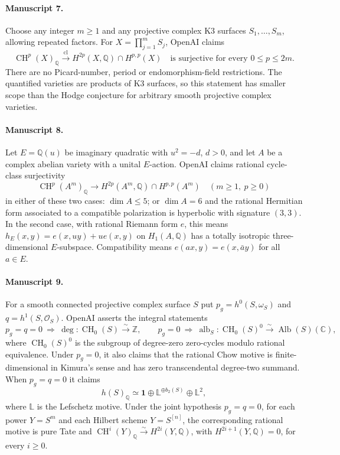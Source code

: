 \documentclass[11pt]{article}
\begin{document}
\paragraph{Manuscript 7.}
Choose any integer $m\ge1$ and any projective complex K3 surfaces $S_1,\ldots,S_m$, allowing repeated factors. For $X=\prod_{j=1}^m S_j$, OpenAI claims
\[
\operatorname{CH}^p(X)_{\mathbb Q}\xrightarrow{\operatorname{cl}}
H^{2p}(X,\mathbb Q)\cap H^{p,p}(X)
\quad\text{is surjective for every }0\le p\le2m.
\]
There are no Picard-number, period or endomorphism-field restrictions. The quantified varieties are products of K3 surfaces, so this statement has smaller scope than the Hodge conjecture for arbitrary smooth projective complex varieties.

\paragraph{Manuscript 8.}
Let $E=\mathbb Q(u)$ be imaginary quadratic with $u^2=-d$, $d>0$, and let $A$ be a complex abelian variety with a unital $E$-action. OpenAI claims rational cycle-class surjectivity
\[
\operatorname{CH}^p(A^m)_{\mathbb Q}\longrightarrow H^{2p}(A^m,\mathbb Q)\cap H^{p,p}(A^m)
\quad(m\ge1,\ p\ge0)
\]
in either of these two cases: $\dim A\le5$; or $\dim A=6$ and the rational Hermitian form associated to a compatible polarization is hyperbolic with signature $(3,3)$. In the second case, with rational Riemann form $e$, this means $h_E(x,y)=e(x,uy)+u e(x,y)$ on $H_1(A,\mathbb Q)$ has a totally isotropic three-dimensional $E$-subspace. Compatibility means $e(ax,y)=e(x,\bar a y)$ for all $a\in E$.

\paragraph{Manuscript 9.}
For a smooth connected projective complex surface $S$ put $p_g=h^0(S,\omega_S)$ and $q=h^1(S,\mathcal O_S)$. OpenAI asserts the integral statements
\[
p_g=q=0\ \Longrightarrow\ \deg:\operatorname{CH}_0(S)\xrightarrow{\sim}\mathbb Z,
\qquad
p_g=0\ \Longrightarrow\ \operatorname{alb}_S:\operatorname{CH}_0(S)^0\xrightarrow{\sim}\operatorname{Alb}(S)(\mathbb C),
\]
where $\operatorname{CH}_0(S)^0$ is the subgroup of degree-zero zero-cycles modulo rational equivalence. Under $p_g=0$, it also claims that the rational Chow motive is finite-dimensional in Kimura's sense and has zero transcendental degree-two summand. When $p_g=q=0$ it claims
\[
h(S)_{\mathbb Q}\simeq\mathbf1\oplus\mathbb L^{\oplus b_2(S)}\oplus\mathbb L^2,
\]
where $\mathbb L$ is the Lefschetz motive. Under the joint hypothesis $p_g=q=0$, for each power $Y=S^m$ and each Hilbert scheme $Y=S^{[n]}$, the corresponding rational motive is pure Tate and $\operatorname{CH}^i(Y)_{\mathbb Q}\xrightarrow{\sim}H^{2i}(Y,\mathbb Q)$, with $H^{2i+1}(Y,\mathbb Q)=0$, for every $i\ge0$.
\end{document}
